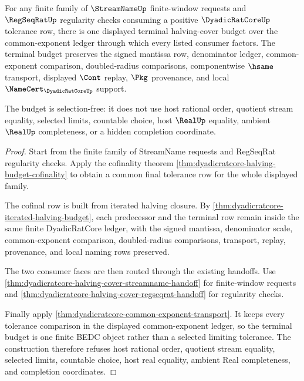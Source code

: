 \begin{theorem}
\label{thm:dyadicratcore-terminal-halving-cover-selection-free}
For any finite family of $\StreamNameUp$ finite-window requests and $\RegSeqRatUp$ regularity checks consuming a positive $\DyadicRatCoreUp$ tolerance row, there is one displayed terminal halving-cover budget over the common-exponent ledger through which every listed consumer factors. The terminal budget preserves the signed mantissa row, denominator ledger, common-exponent comparison, doubled-radius comparisons, componentwise $\hsame$ transport, displayed $\Cont$ replay, $\Pkg$ provenance, and local $\NameCert_{\DyadicRatCoreUp}$ support.

The budget is selection-free: it does not use host rational order, quotient stream equality, selected limits, countable choice, host $\RealUp$ equality, ambient $\RealUp$ completeness, or a hidden completion coordinate.
\end{theorem}
\begin{proof}
Start from the finite family of StreamName requests and RegSeqRat regularity checks. Apply the cofinality theorem \autoref{thm:dyadicratcore-halving-budget-cofinality} to obtain a common final tolerance row for the whole displayed family.

The cofinal row is built from iterated halving closure. By \autoref{thm:dyadicratcore-iterated-halving-budget}, each predecessor and the terminal row remain inside the same finite DyadicRatCore ledger, with the signed mantissa, denominator scale, common-exponent comparison, doubled-radius comparisons, transport, replay, provenance, and local naming rows preserved.

The two consumer faces are then routed through the existing handoffs. Use \autoref{thm:dyadicratcore-halving-cover-streamname-handoff} for finite-window requests and \autoref{thm:dyadicratcore-halving-cover-regseqrat-handoff} for regularity checks.

Finally apply \autoref{thm:dyadicratcore-common-exponent-transport}. It keeps every tolerance comparison in the displayed common-exponent ledger, so the terminal budget is one finite BEDC object rather than a selected limiting tolerance. The construction therefore refuses host rational order, quotient stream equality, selected limits, countable choice, host real equality, ambient Real completeness, and completion coordinates.
\end{proof}

